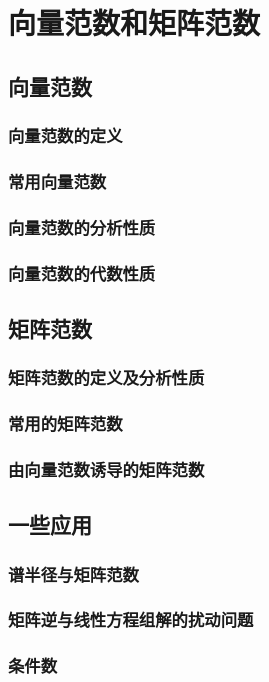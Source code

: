 \chapter{向量范数和矩阵范数}
\label{cha:向量范数和矩阵范数}

\section{向量范数}
\label{sec:向量范数}

\subsection{向量范数的定义}
\label{sub:向量范数的定义}

\subsection{常用向量范数}
\label{sub:常用向量范数}

\subsection{向量范数的分析性质}
\label{sub:向量范数的分析性质}

\subsection{向量范数的代数性质}
\label{sub:向量范数的代数性质}

\section{矩阵范数}
\label{sec:矩阵范数}

\subsection{矩阵范数的定义及分析性质}
\label{sub:矩阵范数的定义及分析性质}

\subsection{常用的矩阵范数}
\label{sub:常用的矩阵范数}

\subsection{由向量范数诱导的矩阵范数}
\label{sub:由向量范数诱导的矩阵范数}

\section{一些应用}
\label{sec:一些应用}

\subsection{谱半径与矩阵范数}
\label{sub:谱半径与矩阵范数}

\subsection{矩阵逆与线性方程组解的扰动问题}
\label{sub:矩阵逆与线性方程组解的扰动问题}

\subsection{条件数}
\label{sub:条件数}

